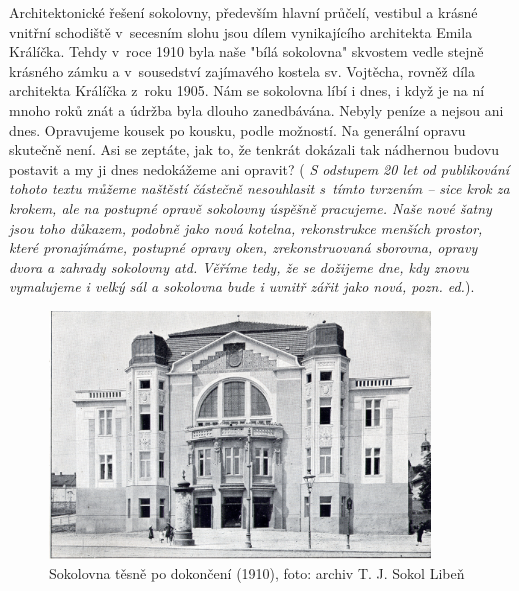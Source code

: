 \documentclass[a5paper, 11pt, twoside]{article}
\newcommand{\pozned}[1]{%
\textit{#1}}
\begin{document}
Architektonické řešení sokolovny, především hlavní průčelí, vestibul a
krásné vnitřní schodiště v~secesním slohu jsou dílem vynikajícího
architekta Emila Králíčka. Tehdy v~roce 1910 byla naše "bílá sokolovna"
skvostem vedle stejně krásného zámku a v~sousedství zajímavého kostela
sv. Vojtěcha, rovněž díla architekta Králíčka z~roku 1905. Nám se
sokolovna líbí i dnes, i když je na ní mnoho roků znát a údržba byla
dlouho zanedbávána. Nebyly peníze a nejsou ani dnes. Opravujeme kousek
po kousku, podle možností. Na generální opravu skutečně není. Asi se
zeptáte, jak to, že tenkrát dokázali tak nádhernou budovu postavit a my
ji dnes nedokážeme ani opravit? (\pozned{S odstupem 20 let od publikování
tohoto textu můžeme naštěstí částečně nesouhlasit s~tímto tvrzením --
sice krok za krokem, ale na postupné opravě sokolovny úspěšně pracujeme.
Naše nové šatny jsou toho důkazem, podobně jako nová kotelna,
rekonstrukce menších prostor, které pronajímáme, postupné opravy oken,
zrekonstruovaná sborovna, opravy dvora a zahrady sokolovny atd. Věříme
tedy, že se dožijeme dne, kdy znovu vymalujeme i velký sál a sokolovna
bude i uvnitř zářit jako nová, pozn. ed.}).

\begin{figure}[h!]
  \centering 
  \includegraphics[width=0.9\textwidth]{img/19_sokolovna_dokoncena.jpg}
  \caption*{Sokolovna těsně po dokončení (1910), foto: archiv T. J. Sokol
  Libeň}
\end{figure}
\end{document}
